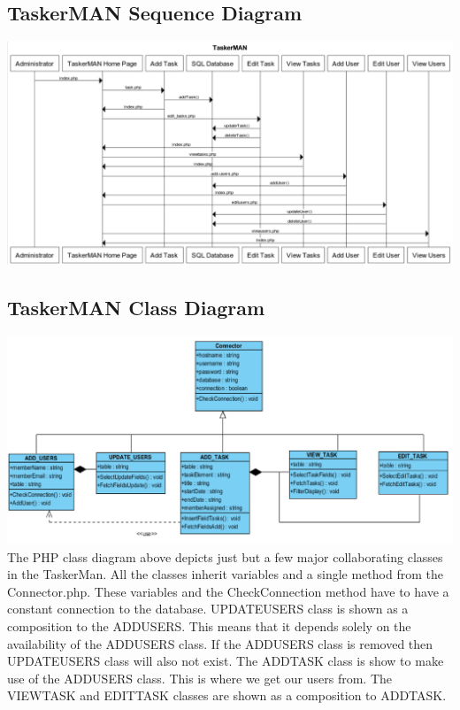 \documentclass{project}
\begin{document}
\subsection{TaskerMAN Sequence Diagram}
\includegraphics[width=1\textwidth, center]{images/Detailed-Design/TaskerMANSequenceDiagram} \\
\clearpage
\subsection{TaskerMAN Class Diagram}
\includegraphics[width=1\textwidth, center]{images/Detailed-Design/TaskerMANClassDiagram} \\
The PHP class diagram above depicts just but a few major collaborating classes in the TaskerMan.  All the classes inherit variables and a single method from the Connector.php.  These variables and the CheckConnection method have to have a constant connection to the database. 
UPDATE\textunderscore USERS class is shown as a composition to the ADD\textunderscore USERS.  This means that it depends solely on the availability of the ADD\textunderscore USERS class.  If the ADD\textunderscore USERS class is removed then UPDATE\textunderscore USERS class will also not exist.
The ADD\textunderscore TASK class is show to make use of the ADD\textunderscore USERS class.  This is where we get our users from.  The VIEW\textunderscore TASK and EDIT\textunderscore TASK   classes are shown as a composition to ADD\textunderscore TASK.
\end{document}
